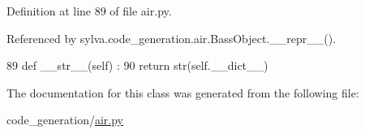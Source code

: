 Definition at line 89 of file air.\+py.



Referenced by sylva.\+code\+\_\+generation.\+air.\+Bass\+Object.\+\_\+\+\_\+repr\+\_\+\+\_\+().


\begin{DoxyCode}
89   \textcolor{keyword}{def }\_\_str\_\_(self) :
90     \textcolor{keywordflow}{return} str(self.\_\_dict\_\_)
\end{DoxyCode}


The documentation for this class was generated from the following file\+:\begin{DoxyCompactItemize}
\item 
code\+\_\+generation/\hyperlink{air_8py}{air.\+py}\end{DoxyCompactItemize}
